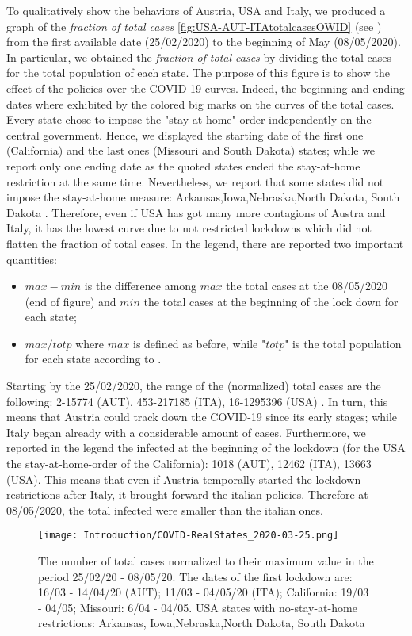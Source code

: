 \documentclass[a4paper,10pt,twoside]{book} %
\theoremstyle{definition}
\begin{document}
To qualitatively show the behaviors of Austria, USA and Italy, we produced a graph of the \textit{fraction of total cases}  \autoref{fig:USA-AUT-ITAtotalcasesOWID} (see \cite{JHUGitHub:2020_TotalCases}) from the first available date (25/02/2020) to the beginning of May (08/05/2020). In particular, we obtained the \textit{fraction of total cases} by dividing the total cases for the total population of each state.
The purpose of this figure is to show the effect of the policies over the COVID-19 curves.
Indeed, the beginning and ending dates where exhibited by the colored big marks on the curves of the total cases. Every state chose to impose the "stay-at-home" order independently on the central government. Hence, we displayed the starting date of the first one (California) and the last ones (Missouri and South Dakota) states; while we report only one ending date as the quoted states ended the stay-at-home restriction at the same time. Nevertheless, we report that some states did not impose the stay-at-home measure: Arkansas,Iowa,Nebraska,North Dakota,	South Dakota \cite{NBC_USA:2020_InitalDates}.
Therefore, even if USA has got many more contagions of Austra and Italy, it has the lowest curve due to not restricted lockdowns which did not flatten the fraction of total cases. 
In the legend, there are reported two important quantities:
\begin{itemize}
	\item $max - min$ is the difference among $max$ the total cases at the 08/05/2020 (end of figure) and $min$ the total cases at the beginning of the lock down for each state;
	\item $max / totp$ where $max$ is defined as before, while "$totp$" is the total population for each state according to \cite{PopulationEstimate}.
\end{itemize}
Starting by the 25/02/2020, the range of the (normalized) total cases are the following: 2-15774 (AUT), 453-217185 (ITA), 16-1295396 (USA) \cite{JHUGitHub:2020_TotalCases}. In turn, this means that Austria could track down the COVID-19 since its early stages; while Italy began already with a considerable amount of cases. Furthermore, we reported in the legend the infected at the beginning of the lockdown (for the USA the stay-at-home-order of the California): 1018 (AUT), 12462 (ITA), 13663 (USA). This means that even if Austria temporally started the lockdown restrictions after Italy, it brought forward the italian policies. Therefore at 08/05/2020, the total infected were smaller than the italian ones.
\begin{figure}[tbp]
	\centering
	\texttt{[image: Introduction/COVID-RealStates\_2020-03-25.png]}
	\caption{The number of total cases normalized to their maximum value in the period 25/02/20 - 08/05/20. The dates of the first lockdown are: 16/03 - 14/04/20 (AUT); 11/03 - 04/05/20 (ITA); California: 19/03 - 04/05; Missouri: 6/04 - 04/05. USA states with no-stay-at-home restrictions: Arkansas,	Iowa,Nebraska,North Dakota,	South Dakota}
	\label{fig:USA-AUT-ITAtotalcasesOWID}
\end{figure}
\end{document}
